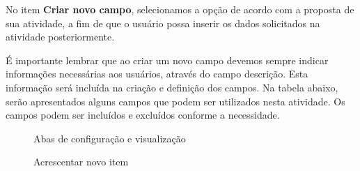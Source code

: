 No item \textbf{Criar novo campo}, selecionamos a opção de acordo com a proposta de sua atividade, a fim de que o usuário possa inserir os dados solicitados na atividade posteriormente.

É importante lembrar que ao criar um novo campo devemos sempre indicar informações necessárias aos usuários, através do campo descrição. Esta informação será incluída na criação e definição dos campos. Na tabela abaixo, serão apresentados alguns campos que podem ser utilizados nesta atividade. Os campos podem ser incluídos e excluídos conforme a necessidade.


\begin{figure}[tbp]
 \begin{center}
  \caption{Abas de configuração e visualização}
  \label{fig:cap5_4}
 \end{center}
\end{figure}

\begin{figure}[htbp]
 \begin{center}
  \caption{Acrescentar novo item}
  \label{fig:cap5_5}
 \end{center}
\end{figure}


